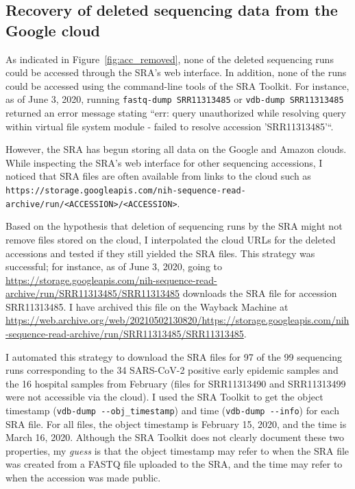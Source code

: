 \documentclass[9pt,twocolumn,twoside]{gsajnl_modified}
\begin{document}
\subsection{Recovery of deleted sequencing data from the Google cloud} 
As indicated in Figure~\ref{fig:acc_removed}, none of the deleted sequencing runs could be accessed through the SRA's web interface.
In addition, none of the runs could be accessed using the command-line tools of the SRA Toolkit.
For instance, as of June 3, 2020, running \texttt{fastq-dump SRR11313485} or \texttt{vdb-dump SRR11313485} returned an error message stating ``err: query unauthorized while resolving query within virtual file system module - failed to resolve accession 'SRR11313485'``.

However, the SRA has begun storing all data on the Google and Amazon clouds.
While inspecting the SRA's web interface for other sequencing accessions, I noticed that SRA files are often available from links to the cloud such as \texttt{https://storage.googleapis.com/nih-sequence-read-archive/run/<ACCESSION>/<ACCESSION>}.

Based on the hypothesis that deletion of sequencing runs by the SRA might not remove files stored on the cloud, I interpolated the cloud URLs for the deleted accessions and tested if they still yielded the SRA files.
This strategy was successful; for instance, as of June 3, 2020, going to \url{https://storage.googleapis.com/nih-sequence-read-archive/run/SRR11313485/SRR11313485} downloads the SRA file for accession SRR11313485.
I have archived this file on the Wayback Machine at \url{https://web.archive.org/web/20210502130820/https://storage.googleapis.com/nih-sequence-read-archive/run/SRR11313485/SRR11313485}.

I automated this strategy to download the SRA files for 97 of the 99 sequencing runs corresponding to the 34 SARS-CoV-2 positive early epidemic samples and the 16 hospital samples from February (files for SRR11313490 and SRR11313499 were not accessible via the cloud).
I used the SRA Toolkit to get the object timestamp (\texttt{vdb-dump -{}-obj\_timestamp}) and time (\texttt{vdb-dump -{}-info}) for each SRA file.
For all files, the object timestamp is February 15, 2020, and the time is March 16, 2020.
Although the SRA Toolkit does not clearly document these two properties, my \emph{guess} is that the object timestamp may refer to when the SRA file was created from a FASTQ file uploaded to the SRA, and the time may refer to when the accession was made public.
\end{document}
